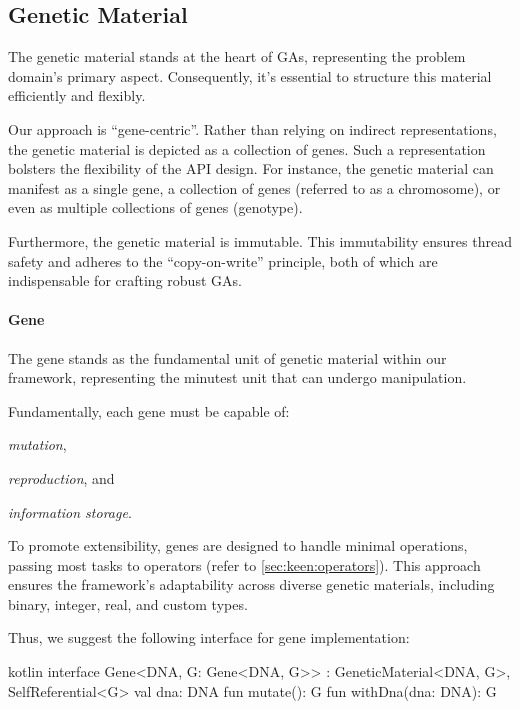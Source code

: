 \subsection{Genetic Material}
\label{sec:keen:ga:material}
  The genetic material stands at the heart of GAs, representing the problem 
  domain's primary aspect.
  Consequently, it's essential to structure this material efficiently and 
  flexibly.

  Our approach is \enquote{gene-centric}.
  Rather than relying on indirect representations, the genetic material is 
  depicted as a collection of genes.
  Such a representation bolsters the flexibility of the API design.
  For instance, the genetic material can manifest as a single gene, a 
  collection of genes (referred to as a chromosome), or even as multiple 
  collections of genes (genotype).

  Furthermore, the genetic material is immutable.
  This immutability ensures thread safety and adheres to the 
  \enquote{copy-on-write} principle, both of which are indispensable for 
  crafting robust GAs.

  \paragraph{Gene}
    The gene stands as the fundamental unit of genetic material within our 
    framework, representing the minutest unit that can undergo manipulation.

    Fundamentally, each gene must be capable of:
    \begin{enumerate*}
      \item \textit{mutation},
      \item \textit{reproduction}, and
      \item \textit{information storage}.
    \end{enumerate*}
    To promote extensibility, genes are designed to handle minimal 
    operations, passing most tasks to operators 
    (refer to \vref{sec:keen:operators}).
    This approach ensures the framework's adaptability across diverse 
    genetic materials, including binary, integer, real, and custom types.

    Thus, we suggest the following interface for gene implementation:

    \begin{code}{kotlin}
      interface Gene<DNA, G: Gene<DNA, G>> : GeneticMaterial<DNA, G>,
                                              SelfReferential<G> {
          val dna: DNA
          fun mutate(): G
          fun withDna(dna: DNA): G
      }
    \end{code}


